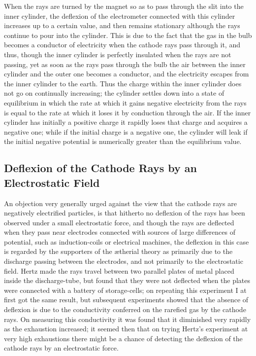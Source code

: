 When the rays are turned by the magnet so as to pass through the slit
into the inner cylinder, the deflexion of the electrometer connected
with this cylinder increases up to a certain value, and then remains
stationary although the rays continue to pour into the cylinder. This is
due to the fact that the gas in the bulb becomes a conductor of
electricity when the cathode rays pass through it, and thus, though the
inner cylinder is perfectly insulated when the rays are not passing, yet
as soon as the rays pass through the bulb the air between the inner
cylinder and the outer one becomes a conductor, and the electricity
escapes from the inner cylinder to the earth. Thus the charge within the
inner cylinder does not go on continually increasing; the cylinder
settles down into a state of equilibrium in which the rate at which it
gains negative electricity from the rays is equal to the rate at which
it loses it by conduction through the air. If the inner cylinder has
initially a positive charge it rapidly loses that charge and acquires a
negative one; while if the initial charge is a negative one, the
cylinder will leak if the initial negative potential is numerically
greater than the equilibrium value.

\subsection*{Deflexion of the Cathode Rays by an Electrostatic Field}

An objection very generally urged against the view that the cathode rays
are negatively electrified particles, is that hitherto no deflexion of
the rays has been observed under a small electrostatic force, and though
the rays are deflected when they pass near electrodes connected with
sources of large differences of potential, such as induction-coils or
electrical machines, the deflexion in this case is regarded by the
supporters of the ætherial theory as primarily due to the discharge
passing between the electrodes, and not primarily to the electrostatic
field. Hertz made the rays travel between two parallel plates of metal
placed inside the discharge-tube, but found that they were not deflected
when the plates were connected with a battery of storage-cells; on
repeating this experiment I at first got the same result, but subsequent
experiments showed that the absence of deflexion is due to the
conductivity conferred on the rarefied gas by the cathode rays. On
measuring this conductivity it was found that it diminished very rapidly
as the exhaustion increased; it seemed then that on trying Hertz's
experiment at very high exhaustions there might be a chance of detecting
the deflexion of the cathode rays by an electrostatic force.

